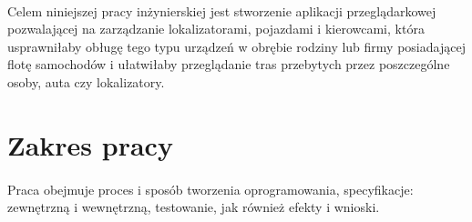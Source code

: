 \paragraph{}
Celem niniejszej pracy inżynierskiej jest stworzenie aplikacji przeglądarkowej pozwalającej na zarządzanie lokalizatorami, pojazdami i kierowcami, która usprawniłaby obługę tego typu urządzeń w obrębie rodziny lub firmy posiadającej flotę samochodów i ułatwiłaby przeglądanie tras przebytych przez poszczególne osoby, auta czy lokalizatory.

\section{Zakres pracy}
\paragraph{}
 Praca obejmuje proces i sposób tworzenia oprogramowania, specyfikacje: zewnętrzną i wewnętrzną, testowanie, jak również efekty i wnioski.

